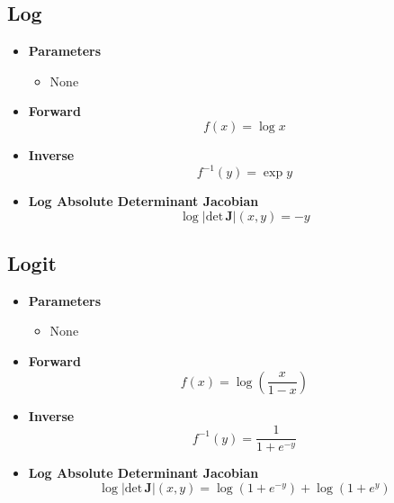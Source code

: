 \documentclass{article}
\begin{document}
\subsection{Log}
\begin{itemize}
  \item \textbf{Parameters}
  \begin{itemize}
    \item None
  \end{itemize}
  \item \textbf{Forward}
  \begin{equation}
    f(x) = \log x
  \end{equation}
  \item \textbf{Inverse}
  \begin{equation}
    f^{-1}(y) = \exp y
  \end{equation}
  \item \textbf{Log Absolute Determinant Jacobian}
  \begin{equation}
    \log \vert \text{det} \, \mathbf{J} \vert (x, y) = - y
  \end{equation}
\end{itemize}
\subsection{Logit}
\begin{itemize}
  \item \textbf{Parameters}
  \begin{itemize}
    \item None
  \end{itemize}
  \item \textbf{Forward}
  \begin{equation}
    f(x) = \log \left( \frac{x}{1 - x} \right)
  \end{equation}
  \item \textbf{Inverse}
  \begin{equation}
    f^{-1}(y) = \frac{1}{1 + e^{-y}}
  \end{equation}
  \item \textbf{Log Absolute Determinant Jacobian}
  \begin{equation}
    \log \vert \text{det} \, \mathbf{J} \vert (x, y) = \log\left( 1 + e^{-y} \right) + \log\left( 1 + e^{y} \right)
  \end{equation}
\end{itemize}
\end{document}
